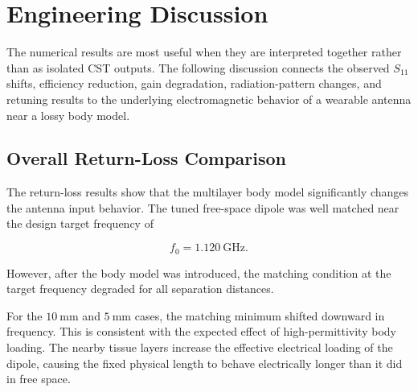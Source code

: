 \section{Engineering Discussion}

The numerical results are most useful when they are interpreted together rather than as isolated CST outputs. The following discussion connects the observed \(S_{11}\) shifts, efficiency reduction, gain degradation, radiation-pattern changes, and retuning results to the underlying electromagnetic behavior of a wearable antenna near a lossy body model.

\subsection{Overall Return-Loss Comparison}

The return-loss results show that the multilayer body model significantly changes the antenna input behavior. The tuned free-space dipole was well matched near the design target frequency of

\[
f_0 = 1.120~\mathrm{GHz}.
\]

However, after the body model was introduced, the matching condition at the target frequency degraded for all separation distances.

\begin{table}[htbp]
\centering
\caption{Overall return-loss comparison for the free-space and body-loaded cases.}
\label{tab:engineering-s11-comparison}
\end{table}

For the \(10~\mathrm{mm}\) and \(5~\mathrm{mm}\) cases, the matching minimum shifted downward in frequency. This is consistent with the expected effect of high-permittivity body loading. The nearby tissue layers increase the effective electrical loading of the dipole, causing the fixed physical length to behave electrically longer than it did in free space.

